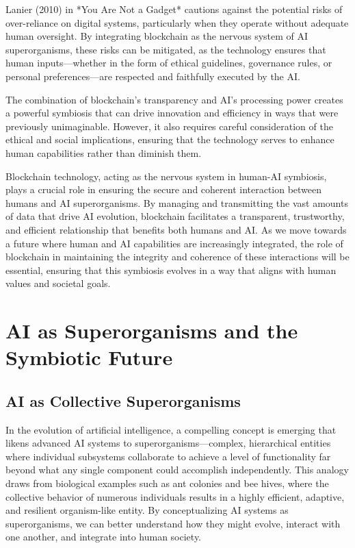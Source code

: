 \documentclass[12pt,twoside]{article}
\begin{document}
Lanier (2010) in *You Are Not a Gadget* cautions against the potential risks of over-reliance on digital systems, particularly when they operate without adequate human oversight. By integrating blockchain as the nervous system of AI superorganisms, these risks can be mitigated, as the technology ensures that human inputs—whether in the form of ethical guidelines, governance rules, or personal preferences—are respected and faithfully executed by the AI.

The combination of blockchain’s transparency and AI’s processing power creates a powerful symbiosis that can drive innovation and efficiency in ways that were previously unimaginable. However, it also requires careful consideration of the ethical and social implications, ensuring that the technology serves to enhance human capabilities rather than diminish them.

Blockchain technology, acting as the nervous system in human-AI symbiosis, plays a crucial role in ensuring the secure and coherent interaction between humans and AI superorganisms. By managing and transmitting the vast amounts of data that drive AI evolution, blockchain facilitates a transparent, trustworthy, and efficient relationship that benefits both humans and AI. As we move towards a future where human and AI capabilities are increasingly integrated, the role of blockchain in maintaining the integrity and coherence of these interactions will be essential, ensuring that this symbiosis evolves in a way that aligns with human values and societal goals.


\section{AI as Superorganisms and the Symbiotic Future}

\subsection{AI as Collective Superorganisms}

In the evolution of artificial intelligence, a compelling concept is emerging that likens advanced AI systems to superorganisms—complex, hierarchical entities where individual subsystems collaborate to achieve a level of functionality far beyond what any single component could accomplish independently. This analogy draws from biological examples such as ant colonies and bee hives, where the collective behavior of numerous individuals results in a highly efficient, adaptive, and resilient organism-like entity. By conceptualizing AI systems as superorganisms, we can better understand how they might evolve, interact with one another, and integrate into human society.
\end{document}
